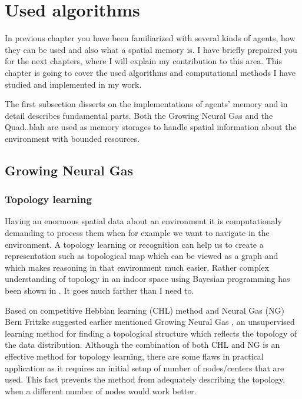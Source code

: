 \chapter{Used algorithms}

In previous chapter you have been familiarized with several kinds of agents, how they can be used and also what a spatial memory is. I have briefly prepaired you for the next chapters, where I will explain my contribution to this area. This chapter is going to cover the used algorithms and computational methods I have studied and implemented in my work. 

The first subsection disserts on the implementations of agents' memory and in detail describes fundamental parts. Both the Growing Neural Gas and the Quad..blah are used as memory storages to handle spatial information about the environment with bounded resources.

\section{Growing Neural Gas}

\subsection{Topology learning}

Having an enormous spatial data about an environment it is computationaly demanding to process them when for example we want to navigate in the environment. A topology learning or recognition can help us to create a representation such as topological map which can be viewed as a graph and which makes reasoning in that environment much easier. Rather complex understanding of topology in an indoor space using Bayesian programming has been shown in \cite{Tapus:topologylearning}. It goes much farther than I need to. 

Based on competitive Hebbian learning (CHL) method \cite{Martinetz:chl} and Neural Gas (NG) \cite{Martinetz:ng} Bern Fritzke suggested earlier mentioned Growing Neural Gas \cite{Fritzke:gng}, an unsupervised learning method for finding a topological structure which reflects the topology of the data distribution. Although the combination of both CHL and NG is an effective method for topology learning, there are some flaws in practical application as it requires an initial setup of number of nodes/centers that are used. This fact prevents the method from adequately describing the topology, when a different number of nodes would work better.

